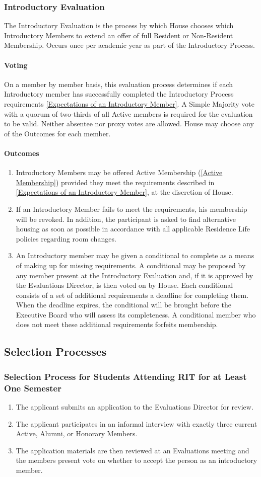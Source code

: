 \documentclass{article}
\newcommand{\bsection}[1]{\subsection{#1} \label{#1}}
\newcommand{\bsubsection}[1]{\subsubsection{#1} \label{#1}}
\newcommand{\bsubsubsection}[1]{\paragraph{#1} \label{#1}}
\begin{document}
\bsubsection{Introductory Evaluation}
The Introductory Evaluation is the process by which House chooses which Introductory Members to extend an offer of full Resident or Non-Resident Membership. Occurs once per academic year as part of the Introductory Process.
\bsubsubsection{Voting} 
On a member by member basis, this evaluation process determines if each Introductory member has successfully completed the Introductory Process requirements \ref{Expectations of an Introductory Member}. A Simple Majority vote with a quorum of two-thirds of all Active members is required for the evaluation to be valid. Neither absentee nor proxy votes are allowed. House may choose any of the Outcomes for each member.
\bsubsubsection{Outcomes} 
\renewcommand{\theenumi}{\alph{enumi}} %
\begin{enumerate}
	\item Introductory Members may be offered Active Membership (\ref{Active Membership}) provided they meet the requirements described in \ref{Expectations of an Introductory Member}, at the discretion of House.
	\item If an Introductory Member fails to meet the requirements, his membership will be revoked. In addition, the participant is asked to find alternative housing as soon as possible in accordance with all applicable Residence Life policies regarding room changes.
	\item An Introductory member may be given a conditional to complete as a means of making up for missing requirements. A conditional may be proposed by any member present at the Introductory Evaluation and, if it is approved by the Evaluations Director, is then voted on by House. Each conditional consists of a set of additional requirements a deadline for completing them. When the deadline expires, the conditional will be brought before the Executive Board who will assess its completeness. A conditional member who does not meet these additional requirements forfeits membership.
\end{enumerate}
\bsection{Selection Processes}
\renewcommand{\theenumi}{\alph{enumi}} %
\bsubsection{Selection Process for Students Attending RIT for at Least One Semester}
\begin{enumerate}
	\item The applicant submits an application to the Evaluations Director for review.
	\item The applicant participates in an informal interview with exactly three current Active, Alumni, or Honorary Members.
	\item The application materials are then reviewed at an Evaluations meeting and the members present vote on whether to accept the person as an introductory member.
\end{enumerate}
\end{document}
